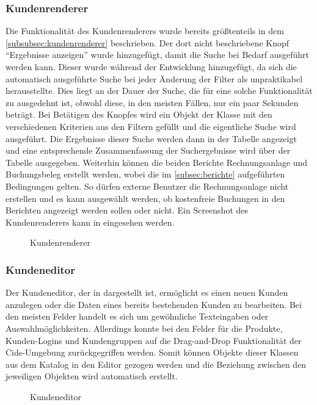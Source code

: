 \subsubsection{Kundenrenderer}
Die Funktionalität des Kundenrenderers wurde bereits größtenteils in dem \autoref{subsubsec:kundenrenderer} beschrieben.
Der dort nicht beschriebene Knopf "`Ergebnisse anzeigen"' wurde hinzugefügt, damit die Suche bei Bedarf ausgeführt werden kann.
Dieser wurde während der Entwicklung hinzugefügt, da sich die automatisch ausgeführte Suche bei jeder Änderung der Filter als unpraktikabel herausstellte.
Dies liegt an der Dauer der Suche, die für eine solche Funktionalität zu ausgedehnt ist, obwohl diese, in den meisten Fällen, nur ein paar Sekunden beträgt.
Bei Betätigen des Knopfes wird ein Objekt der Klasse  mit den verschiedenen Kriterien aus den Filtern gefüllt und die eigentliche Suche wird ausgeführt.
Die Ergebnisse dieser Suche werden dann in der Tabelle angezeigt und eine entsprechende Zusammenfassung der Suchergebnisse wird über der Tabelle ausgegeben.
Weiterhin können die beiden Berichte Rechnungsanlage und Buchungsbeleg erstellt werden, wobei die im \autoref{subsec:berichte} aufgeführten Bedingungen gelten.
So dürfen externe Benutzer die Rechnungsanlage nicht erstellen und es kann ausgewählt werden, ob kostenfreie Buchungen in den Berichten angezeigt werden sollen oder nicht.
Ein Screenshot des Kundenrenderers kann in  eingesehen werden.

\begin{figure}[htb]
	\centering
	\caption{Kundenrenderer}
	\label{fig:kundenrenderer}
\end{figure}
\subsubsection{Kundeneditor}
Der Kundeneditor, der in  dargestellt ist, ermöglicht es einen neuen Kunden anzulegen oder die Daten eines bereits bestehenden Kunden zu bearbeiten.
Bei den meisten Felder handelt es sich um gewöhnliche Texteingaben oder Auswahlmöglichkeiten.
Allerdings konnte bei den Felder für die Produkte, Kunden-Logins und Kundengruppen auf die Drag-and-Drop Funktionalität der Cids-Umgebung zurückgegriffen werden.
Somit können Objekte dieser Klassen aus dem Katalog in den Editor gezogen werden und die Beziehung zwischen den jeweiligen Objekten wird automatisch erstellt. 
\begin{figure}[htbp]
	\centering
	\caption{Kundeneditor}
	\label{fig:kundeneditor}
\end{figure}

